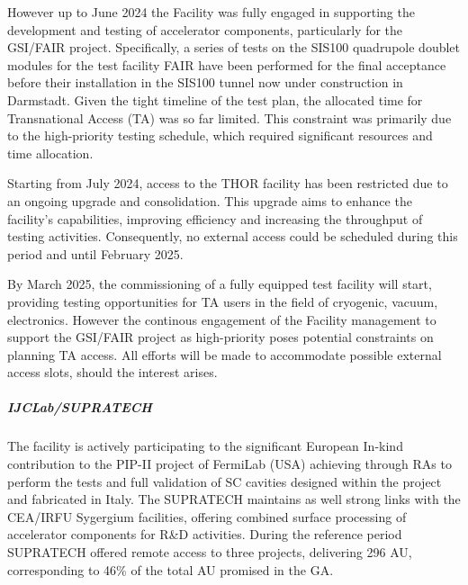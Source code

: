However up to June 2024 the Facility was fully engaged in supporting the development and testing of accelerator components, particularly for the GSI/FAIR project. Specifically, a series of tests on the SIS100 quadrupole doublet modules for the test facility FAIR have been performed for the final acceptance before their installation in the SIS100 tunnel now under construction in Darmstadt. Given the tight timeline of the test plan, the allocated time for Transnational Access (TA) was so far limited. This constraint was primarily due to the high-priority testing schedule, which required significant resources and time allocation.

Starting from July 2024, access to the THOR facility has been restricted due to an ongoing upgrade and consolidation. This upgrade aims to enhance the facility’s capabilities, improving efficiency and increasing the throughput of testing activities. Consequently, no external access could be scheduled during this period and until February 2025.

By March 2025, the commissioning of a fully equipped test facility will start, providing testing opportunities for TA users in the field of cryogenic, vacuum, electronics. However the continous engagement of the Facility management to support the GSI/FAIR project as high-priority poses potential constraints on planning TA access. All efforts will be made to accommodate possible external access slots, should the interest arises. 

\subparagraph{IJCLab/SUPRATECH}
The facility is actively participating to the significant European In-kind contribution  to the PIP-II project of FermiLab (USA) achieving through RAs to perform the tests and full validation of SC cavities designed within the project and fabricated in Italy. The SUPRATECH maintains as well strong links with the CEA/IRFU Sygergium facilities, offering combined surface processing of accelerator components for R\&D activities. 
During the reference period SUPRATECH offered remote access to three projects, delivering 296 AU, corresponding to 46\% of the total AU promised in the GA. 




